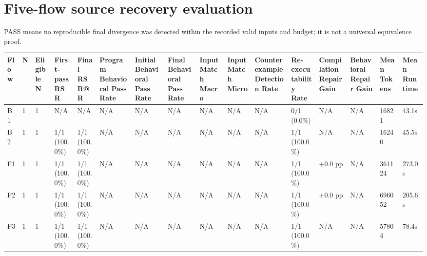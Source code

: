 \documentclass{article}
\begin{document}
\section*{Five-flow source recovery evaluation}
PASS means no reproducible final divergence was detected within the recorded valid inputs and budget; it is not a universal equivalence proof.
\begin{longtable}{llllllllllllllll}
Flow & N & Eligible N & First-pass RSR & Final RSR@R & Program Behavioral Pass Rate & Initial Behavioral Pass Rate & Final Behavioral Pass Rate & Input Match Macro & Input Match Micro & Counterexample Detection Rate & Re-executability Rate & Compilation Repair Gain & Behavioral Repair Gain & Mean Tokens & Mean Runtime \\ \hline
B1 & 1 & 1 & N/A & N/A & N/A & N/A & N/A & N/A & N/A & N/A & 0/1 (0.0\%) & N/A & N/A & 16821 & 43.1s \\
B2 & 1 & 1 & 1/1 (100.0\%) & 1/1 (100.0\%) & N/A & N/A & N/A & N/A & N/A & N/A & 1/1 (100.0\%) & N/A & N/A & 16240 & 45.5s \\
F1 & 1 & 1 & 1/1 (100.0\%) & 1/1 (100.0\%) & N/A & N/A & N/A & N/A & N/A & N/A & 1/1 (100.0\%) & +0.0 pp & N/A & 361124 & 273.0s \\
F2 & 1 & 1 & 1/1 (100.0\%) & 1/1 (100.0\%) & N/A & N/A & N/A & N/A & N/A & N/A & 1/1 (100.0\%) & +0.0 pp & N/A & 696052 & 205.6s \\
F3 & 1 & 1 & 1/1 (100.0\%) & 1/1 (100.0\%) & N/A & N/A & N/A & N/A & N/A & N/A & 1/1 (100.0\%) & N/A & N/A & 57804 & 78.4s \\
\end{longtable}
\end{document}
